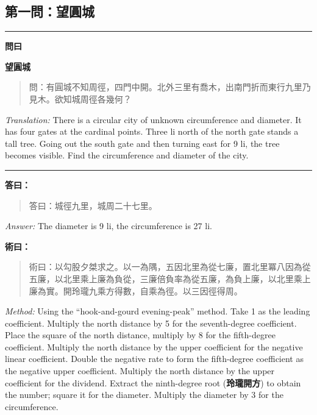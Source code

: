 \documentclass[11pt,a4paper]{article}
\newenvironment{problem}[1][]{%
  \medskip\noindent\rule{\textwidth}{0.4pt}%
  \par\noindent\textbf{\color{sectioncolor}#1}\par\nopagebreak%
  \smallskip%
}{%
  \par\noindent\rule{\textwidth}{0.4pt}\medskip%
}
\newenvironment{answer}{%
  \medskip\noindent{\color{answercolor}\rule{0.5\textwidth}{0.5pt}}%
  \par\color{answercolor}%
}{%
  \par\medskip%
}
\newenvironment{method}{%
  \medskip\noindent{\color{methodcolor}\rule{0.5\textwidth}{0.5pt}}%
  \par\color{methodcolor}%
}{%
  \par\medskip%
}
\begin{document}
\subsection*{第一問：望圓城}

\begin{problem}[\textbf{問曰}]
\textbf{\color{sectioncolor}望圓城}

\begin{quote}
\textcolor{chinacolor}{%
問：有圓城不知周徑，四門中開。北外三里有喬木，出南門折而東行九里乃見木。欲知城周徑各幾何？
}
\end{quote}

\textit{Translation:} There is a circular city of unknown circumference 
and diameter. It has four gates at the cardinal points. Three li north 
of the north gate stands a tall tree. Going out the south gate and then 
turning east for 9 li, the tree becomes visible. Find the circumference 
and diameter of the city.
\end{problem}

\begin{answer}
\textbf{答曰：}

\begin{quote}
\textcolor{chinacolor}{%
答曰：城徑九里，城周二十七里。
}
\end{quote}

\textit{Answer:} The diameter is 9 li, the circumference is 27 li.
\end{answer}

\begin{method}
\textbf{術曰：}

\begin{quote}
\textcolor{chinacolor}{%
術曰：以勾股夕桀求之。以一為隅，五因北里為從七廉，置北里冪八因為從五廉，以北里乘上廉為負從，三廉倍負率為從五廉，為負上廉，以北里乘上廉為實。開玲瓏九乘方得數，自乘為徑。以三因徑得周。
}
\end{quote}

\textit{Method:} Using the ``hook-and-gourd evening-peak'' method. Take 1 
as the leading coefficient. Multiply the north distance by 5 for the 
seventh-degree coefficient. Place the square of the north distance, 
multiply by 8 for the fifth-degree coefficient. Multiply the north 
distance by the upper coefficient for the negative linear coefficient. 
Double the negative rate to form the fifth-degree coefficient as the 
negative upper coefficient. Multiply the north distance by the upper 
coefficient for the dividend. Extract the ninth-degree root (\textbf{玲瓏開方}) 
to obtain the number; square it for the diameter. Multiply the diameter 
by 3 for the circumference.
\end{method}
\end{document}
